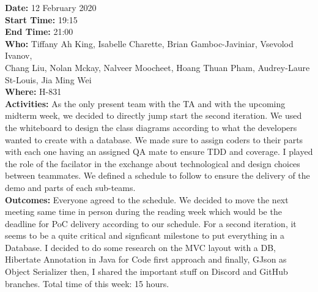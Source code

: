 \documentclass[12pt]{article}
\begin{document}
{\bf Date:} 12 February 2020\\
{\bf Start Time:} 19:15\\
{\bf End Time:} 21:00\\
{\bf Who:} Tiffany Ah King, Isabelle Charette, Brian Gamboc-Javiniar, Vsevolod Ivanov,\\
Chang Liu, Nolan Mckay, Nalveer Moocheet, Hoang Thuan Pham, Audrey-Laure St-Louis, Jia Ming Wei\\
{\bf Where:} H-831\\
{\bf Activities:} As the only present team with the TA and with the upcoming midterm week, we decided to directly jump start the second iteration. We used the whiteboard to design the class diagrams according to what the developers wanted to create with a database. We made sure to assign coders to their parts with each one having an assigned QA mate to ensure TDD and coverage. I played the role of the facilator in the exchange about technological and design choices between teammates. We defined a schedule to follow to ensure the delivery of the demo and parts of each sub-teams.\\
{\bf Outcomes:} Everyone agreed to the schedule. We decided to move the next meeting same time in person during the reading week which would be the deadline for PoC delivery according to our schedule. For a second iteration, it seems to be a quite critical and signficant milestone to put everything in a Database. I decided to do some research on the MVC layout with a DB, Hibertate Annotation in Java for Code first approach and finally, GJson as Object Serializer then, I shared the important stuff on Discord and GitHub branches. Total time of this week: 15 hours.\\

\end{document}
